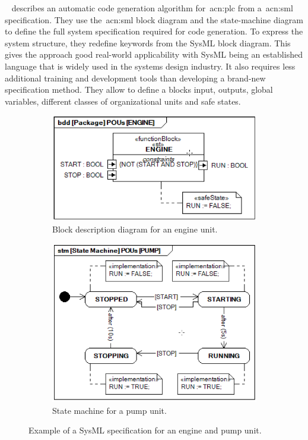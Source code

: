 \citeauthor{6957399}~\cite{6957399} describes an automatic code generation algorithm for~\acrshort{acn:plc} from a~\acrshort{acn:sml} specification.
They use the~\acrshort{acn:sml} block diagram and the state-machine diagram to define the full system specification required for code generation.
To express the system structure, they redefine keywords from the SysML block diagram.
This gives the approach good real-world applicability with SysML being an established language that is widely used in the systems design industry.
It also requires less additional training and development tools than developing a brand-new specification method.
They allow to define a blocks input, outputs, global variables, different classes of organizational units and safe states.
\begin{figure}
	\begin{subfigure}{0.5\textwidth}
		\includegraphics[width=\textwidth]{./Figures/sysml_bdd.png}
		\caption{Block description diagram for an engine unit.}
		\label{fig:sysml:bdd}
	\end{subfigure}
	\begin{subfigure}{0.5\textwidth}
		\includegraphics[width=\textwidth]{./Figures/sysml_stm.png}
		\caption{State machine for a pump unit.}
		\label{fig:sysml:stm}
	\end{subfigure}
	\caption[Example of a SysML specification for an engine and pump unit.]{Example of a SysML specification for an engine and pump unit.~\cite{6957399}}
\end{figure}
